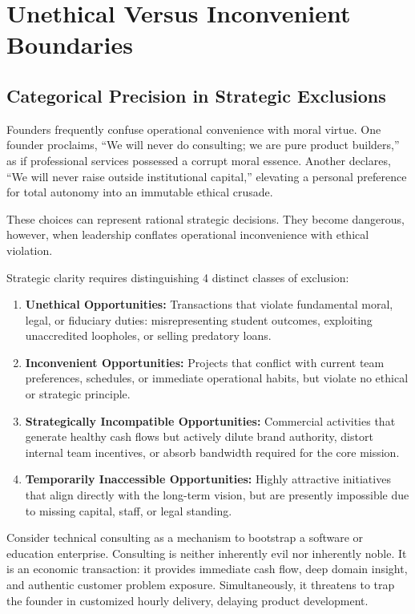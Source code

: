 \section{Unethical Versus Inconvenient Boundaries}

\subsection{Categorical Precision in Strategic Exclusions}

Founders frequently confuse operational convenience with moral virtue. One founder proclaims, ``We will never do consulting; we are pure product builders,'' as if professional services possessed a corrupt moral essence. Another declares, ``We will never raise outside institutional capital,'' elevating a personal preference for total autonomy into an immutable ethical crusade.

These choices can represent rational strategic decisions. They become dangerous, however, when leadership conflates operational inconvenience with ethical violation.

Strategic clarity requires distinguishing 4 distinct classes of exclusion:

\begin{enumerate}[leftmargin=12pt,itemsep=2pt,topsep=1pt,parsep=0pt]
  \item \textbf{Unethical Opportunities:} Transactions that violate fundamental moral, legal, or fiduciary duties: misrepresenting student outcomes, exploiting unaccredited loopholes, or selling predatory loans.
  \item \textbf{Inconvenient Opportunities:} Projects that conflict with current team preferences, schedules, or immediate operational habits, but violate no ethical or strategic principle.
  \item \textbf{Strategically Incompatible Opportunities:} Commercial activities that generate healthy cash flows but actively dilute brand authority, distort internal team incentives, or absorb bandwidth required for the core mission.
  \item \textbf{Temporarily Inaccessible Opportunities:} Highly attractive initiatives that align directly with the long-term vision, but are presently impossible due to missing capital, staff, or legal standing.
\end{enumerate}

Consider technical consulting as a mechanism to bootstrap a software or education enterprise. Consulting is neither inherently evil nor inherently noble. It is an economic transaction: it provides immediate cash flow, deep domain insight, and authentic customer problem exposure. Simultaneously, it threatens to trap the founder in customized hourly delivery, delaying product development.


